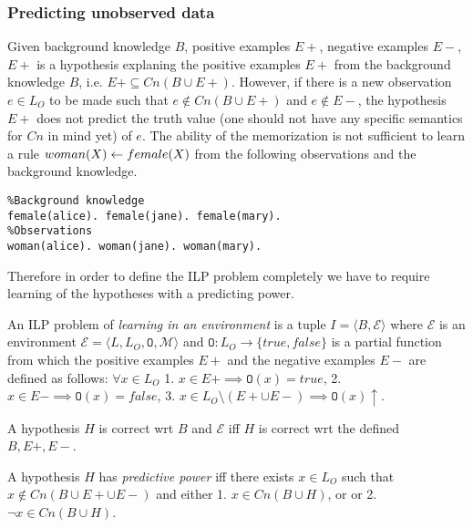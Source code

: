 \subsubsection{Predicting unobserved data}
Given background knowledge $B$, positive examples $E+$, negative examples $E-$, $E+$ is a hypothesis explaning the positive examples $E+$ from the background knowledge $B$, i.e. $E+ \subseteq Cn(B \cup E+)$.
However, if there is a new observation $e \in L_O$ to be made such that
$e \not \in Cn(B \cup E+)$ and $e \not\in E-$, the hypothesis $E+$ does not predict the truth value (one should not have any specific semantics for $Cn$ in mind yet) of $e$. The ability of the memorization is not sufficient to learn a rule $woman(X) \leftarrow female(X)$ from the following observations and the background knowledge.
\begin{exmp}
\begin{lstlisting}
%Background knowledge
female(alice). female(jane). female(mary).
%Observations
woman(alice). woman(jane). woman(mary).
\end{lstlisting}
\end{exmp}

Therefore in order to define the ILP problem completely we have to require learning of the hypotheses with a predicting power.

\begin{defn}
An ILP problem of \emph{learning in an environment} is a tuple $I=\langle B, \mathcal{E} \rangle$ where
$\mathcal{E}$ is an environment
$\mathcal{E}=\langle L, L_O, \mathtt{O}, \mathcal{M} \rangle$
and 
$\mathtt{O}:L_O \to \{true, false\}$ is a partial function from which the positive examples $E+$ and the negative examples $E-$ are defined as follows:
$\forall x \in L_O$
1. $x \in E+ \implies \mathtt{O}(x)=true$,
2. $x \in E- \implies \mathtt{O}(x)=false$,
3. $x \in L_O \setminus (E+ \cup E-) \implies \mathtt{O}(x)\uparrow$.
\end{defn}

\begin{defn}
A hypothesis $H$ is correct wrt $B$ and $\mathcal{E}$ iff
$H$ is correct wrt the defined $B, E+, E-$.
\end{defn}

\begin{defn}
A hypothesis $H$ has \emph{predictive power} iff there exists
$x \in L_O$ such that $x \not \in Cn(B \cup E+ \cup E-)$
and either 1. $x \in Cn(B \cup H)$, or
or 2. $\neg x \in Cn(B \cup H)$.
\end{defn}

